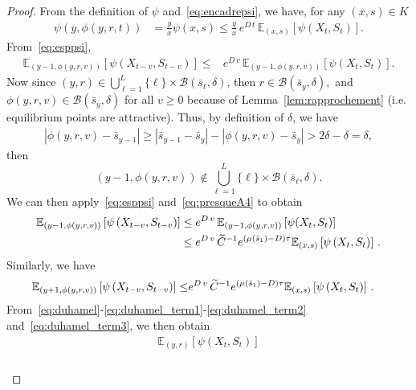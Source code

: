 \documentclass[AHL,Unicode,longabstracts,published]{cedram}
\newcommand{\EE}{\mathbb{E}}
\newcommand{\clB}{\mathcal{B}}
\newcommand{\barmu}{\mu(\bar s_1)}
\newcommand{\1}{\mathbf{1}}
\let\oldtilde\tilde
\renewcommand*{\tilde}[1]{\mathchoice{\widetilde{#1}}{\widetilde{#1}}{\oldtilde{#1}}{\oldtilde{#1}}}
\begin{document}
\begin{proof}
From the definition of $\psi$ and~\eqref{eq:encadrepsi}, we have, for any $(x,s)\in K$
\begin{align}\label{eq:duhamel_term1}
\psi\left(y, \phi(y,r,t)\right) &= \frac{y}{x} \psi\left(x, s\right)
\leq \frac{y}{x}\,e^{D \,t} \, \EE_{(x,s)} \left[\psi (X_t, S_t)\right].
\end{align}
From~\eqref{eq:esppsi},
\begin{align*}
\EE_{\left(y-1, \phi(y,r,v)\right)} \left[\psi (X_{t-v}, S_{t-v})\right]
\leq & e^{D\,v}\,\EE_{\left(y-1, \phi(y,r,v)\right)} \left[\psi (X_{t}, S_{t})\right].
\end{align*}
Now since $(y, r) \in \bigcup_{\ell=1}^L \{\ell\} \times \clB(\bar s_\ell, \delta)$, then $r \in \clB(\bar s_y, \delta),$ and $\phi(y,r,v) \in \clB(\bar s_y, \delta)$ for all $v\geq 0$ because of Lemma~\ref{lem:rapprochement} (i.e. equilibrium points are attractive). Thus, by definition of $\delta$, we have
\begin{align*}
\left|\phi(y,r,v)- \bar s_{y-1} \right|
\geq \left|\bar s_{y-1}- \bar s_y \right| - \left|\phi(y,r,v) - \bar s_{y} \right| > 2\delta - \delta=\delta,
\end{align*}
then
\[
(y-1, \phi(y,r,v)) \notin \bigcup_{\ell=1}^L \{\ell\} \times\clB(\bar s_\ell, \delta).
\]
We can then apply~\eqref{eq:esppsi} and~\eqref{eq:presqueA4} to obtain
\begin{equation}\label{eq:duhamel_term2}
\begin{split}
\EE_{\left(y-1, \phi(y,r,v)\right)} \left[\psi \left(X_{t-v}, S_{t-v}\right)\right] & \leq e^{D\,v}\,\EE_{(y-1, \phi(y,r,v))} \left[\psi (X_t, S_t)\right] \\
& \leq e^{D\,v}\,\tilde C^{-1} e^{(\barmu-D) \tau} \EE_{(x,s)} \left[\psi \left(X_{t}, S_{t}\right)\right] \,.
\end{split}
\end{equation}
Similarly, we have
\begin{align}\label{eq:duhamel_term3}
\EE_{\left(y+1, \phi(y,r,v)\right)} \left[\psi \left(X_{t-v}, S_{t-v}\right)\right]
\leq & e^{D\,v}\, \tilde C^{-1} e^{(\barmu-D) \tau} \EE_{(x,s)} \left[\psi \left(X_{t}, S_{t}\right)\right] \,.
\end{align}
From~\eqref{eq:duhamel}-\eqref{eq:duhamel_term1}-\eqref{eq:duhamel_term2} and~\eqref{eq:duhamel_term3}, we then obtain
\begin{multline*}
\EE_{(y,r)} \left[\psi \left(X_t, S_t\right)\right]\\
\begin{aligned}

\end{aligned}
\end{multline*}
\end{proof}
\end{document}
